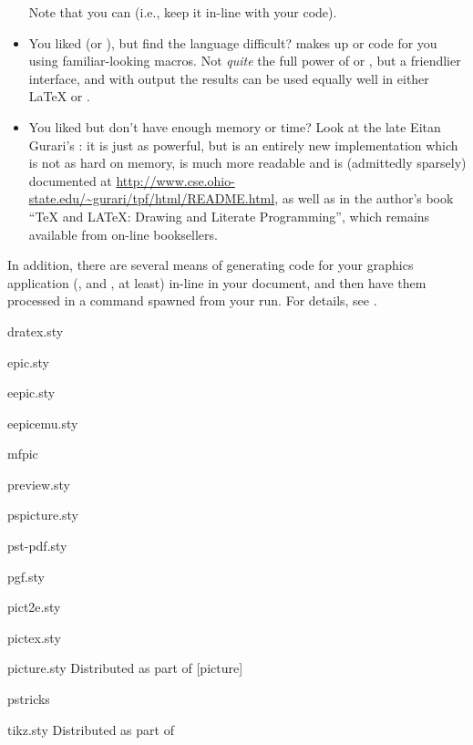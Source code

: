 \begin{itemize}
  Note that you can %
   (i.e.,
  keep it in-line with your \latex{} code).
\item You liked \MF{} (or \MP{}), but find the language difficult?
   makes up \MF{} or \MP{} code for you using
  familiar-looking \AllTeX{} macros.  Not \emph{quite} the full power
  of \MF{} or \MP{}, but a friendlier interface, and with \MP{} output
  the results can be used equally well in either \LaTeX{} or \PDFLaTeX{}.
\item You liked \pictex{} but don't have enough memory or time?  Look
  at the late Eitan Gurari's : it is just as powerful,
  but is an entirely new implementation which is not as hard on
  memory, is much more readable and is (admittedly sparsely) documented at
  \url{http://www.cse.ohio-state.edu/~gurari/tpf/html/README.html},
  as well as in the author's book ``TeX and LATeX: Drawing and
  Literate Programming'', which remains available from on-line
  booksellers.
\end{itemize}

In addition, there are several means of generating code for your
graphics application (,  and
\MP{}, at least) in-line in your document, and then have them
processed in a command spawned from your \AllTeX{} run.  For details,
see .
\begin{ctanrefs}
\item[dratex.sty]
\item[epic.sty]
\item[eepic.sty]
\item[eepicemu.sty]
\item[mfpic]
\item[preview.sty]
\item[pspicture.sty]
\item[pst-pdf.sty]
\item[pgf.sty]
\item[pict2e.sty]
\item[pictex.sty]
\item[picture.sty]Distributed as part of [picture]
\item[pstricks]
\item[tikz.sty]Distributed as part of 
\end{ctanrefs}

